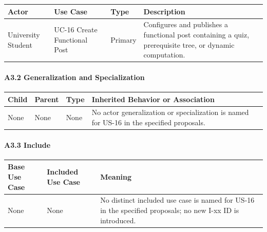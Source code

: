 \documentclass[12pt]{article}
\renewcommand{\baselinestretch}{1.5}
\begin{document}
\begingroup
\small
\renewcommand{\baselinestretch}{1.0}\selectfont
\renewcommand{\arraystretch}{1.15}
\setlength{\tabcolsep}{6pt}
\begin{longtable}{|>{\raggedright\arraybackslash}p{}|>{\raggedright\arraybackslash}p{}|>{\raggedright\arraybackslash}p{}|>{\raggedright\arraybackslash}p{}|}
\hline
\textbf{Actor} & \textbf{Use Case} & \textbf{Type} & \textbf{Description} \\ \hline
\endhead
University Student & UC-16 Create Functional Post & Primary & Configures and publishes a functional post containing a quiz, prerequisite tree, or dynamic computation. \\ \hline
\end{longtable}
\endgroup
\par\medskip

\hypertarget{sec:a3-2-generalization-and-specialization}{}
\paragraph*{A3.2 Generalization and Specialization}
\par\medskip

\begingroup
\small
\renewcommand{\baselinestretch}{1.0}\selectfont
\renewcommand{\arraystretch}{1.15}
\setlength{\tabcolsep}{6pt}
\begin{longtable}{|>{\raggedright\arraybackslash}p{}|>{\raggedright\arraybackslash}p{}|>{\raggedright\arraybackslash}p{}|>{\raggedright\arraybackslash}p{}|}
\hline
\textbf{Child} & \textbf{Parent} & \textbf{Type} & \textbf{Inherited Behavior or Association} \\ \hline
\endhead
None & None & None & No actor generalization or specialization is named for US-16 in the specified proposals. \\ \hline
\end{longtable}
\endgroup
\par\medskip

\hypertarget{sec:a3-3-include}{}
\paragraph*{A3.3 Include}
\par\medskip

\begingroup
\small
\renewcommand{\baselinestretch}{1.0}\selectfont
\renewcommand{\arraystretch}{1.15}
\setlength{\tabcolsep}{6pt}
\begin{longtable}{|>{\raggedright\arraybackslash}p{}|>{\raggedright\arraybackslash}p{}|>{\raggedright\arraybackslash}p{}|}
\hline
\textbf{Base Use Case} & \textbf{Included Use Case} & \textbf{Meaning} \\ \hline
\endhead
None & None & No distinct included use case is named for US-16 in the specified proposals; no new I-xx ID is introduced. \\ \hline
\end{longtable}
\endgroup
\par\medskip
\end{document}
